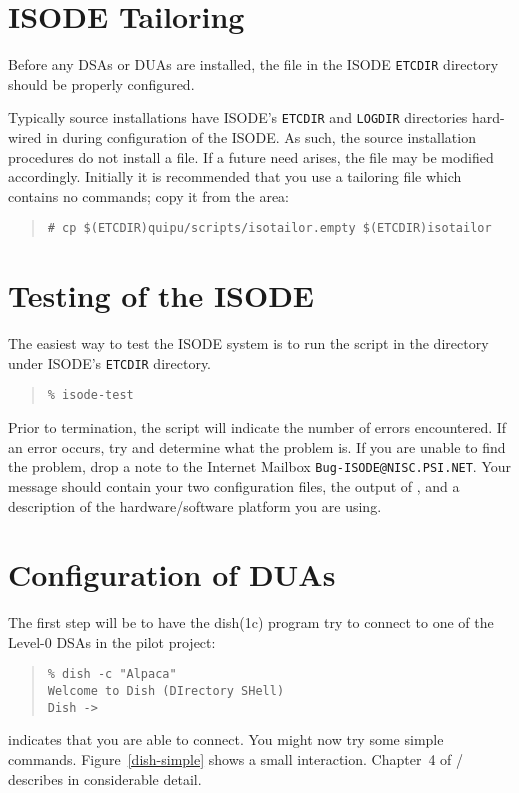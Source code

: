 \section	{ISODE Tailoring}\label{isode:tailoring}
Before any DSAs or DUAs are installed,
the file  in the ISODE \verb"ETCDIR" directory should be
properly configured. 

Typically source installations have ISODE's \verb"ETCDIR" and \verb"LOGDIR"
directories hard-wired in during configuration of the ISODE.
As such,
the source installation procedures do not install a  file.
If a future need arises,
the  file may be modified accordingly.
Initially it is recommended that you use a tailoring file which contains
no commands;
copy it from the  area:
\begin{quote}\small\begin{verbatim}
# cp $(ETCDIR)quipu/scripts/isotailor.empty $(ETCDIR)isotailor
\end{verbatim}\end{quote}

\section	{Testing of the ISODE}\label{isode:testing}
The easiest way to test the ISODE system is to run
the  script in the directory 
under ISODE's \verb"ETCDIR" directory.
\begin{quote}\small\begin{verbatim}
% isode-test
\end{verbatim}\end{quote}
Prior to termination,
the script will indicate the number of errors encountered.
If an error occurs,
try and determine what the problem is.
If you are unable to find the problem,
drop a note to the Internet Mailbox \verb"Bug-ISODE@NISC.PSI.NET".
Your message should contain your two configuration files,
the output of ,
and a description of the hardware/software platform you are using.

\section	{Configuration of DUAs}\label{dua:configure}
The first step will be to have the \man dish(1c) program
try to connect to one of the Level-0 DSAs in the pilot project:
\begin{quote}\small\begin{verbatim}
% dish -c "Alpaca"
Welcome to Dish (DIrectory SHell)
Dish ->
\end{verbatim}\end{quote}
indicates that you are able to connect.
You might now try some simple commands.
Figure~\ref{dish-simple} shows a small interaction.
Chapter~4 of \volfive/ describes  in considerable detail.

